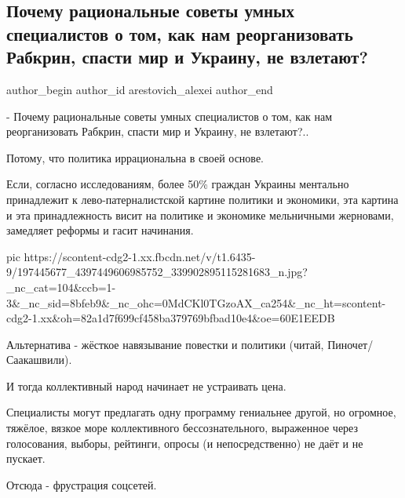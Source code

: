  
 
 
 
 
 
\subsection{Почему рациональные советы умных специалистов о том, как нам реорганизовать Рабкрин, спасти мир и Украину, не взлетают?}
\label{sec:07_06_2021.fb.arestovich_alexei.1.ukraina_razvitie_obschestvo}
\ifcmt
 author_begin
   author_id arestovich_alexei
 author_end
\fi

- Почему рациональные советы умных специалистов о том, как нам реорганизовать Рабкрин, спасти мир и Украину, не взлетают?..

Потому, что политика иррациональна в своей основе.

Если, согласно исследованиям, более 50\% граждан Украины ментально принадлежит
к лево-патерналистской картине политики и экономики, эта картина и эта
принадлежность висит на политике и экономике мельничными жерновами, замедляет
реформы и гасит начинания.

\ifcmt
  pic https://scontent-cdg2-1.xx.fbcdn.net/v/t1.6435-9/197445677_4397449606985752_339902895115281683_n.jpg?_nc_cat=104&ccb=1-3&_nc_sid=8bfeb9&_nc_ohc=0MdCKl0TGzoAX_ca254&_nc_ht=scontent-cdg2-1.xx&oh=82a1d7f699cf458ba379769bfbad10e4&oe=60E1EEDB
\fi

Альтернатива - жёсткое навязывание повестки и политики (читай, Пиночет/Саакашвили).

И тогда коллективный народ начинает не устраивать цена.

Специалисты могут предлагать одну программу гениальнее другой, но огромное,
тяжёлое, вязкое море коллективного бессознательного, выраженное через
голосования, выборы, рейтинги, опросы (и непосредственно) не даёт и не пускает.

Отсюда - фрустрация соцсетей. 

